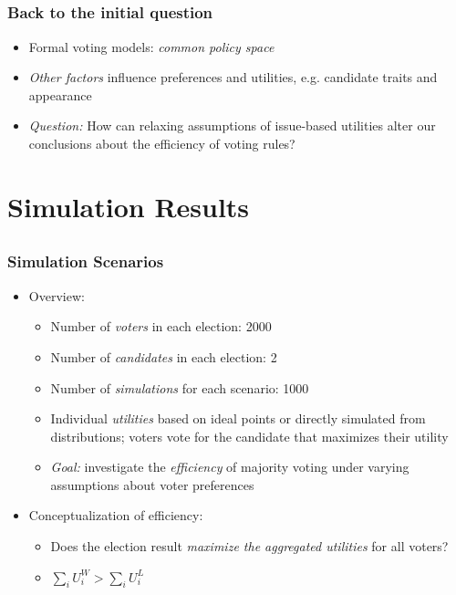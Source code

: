 \documentclass{beamer}
\begin{document}
\subsection{}
\begin{frame}%
  \frametitle{Back to the initial question}
  \begin{itemize}
  \item Formal voting models: \emph{common policy space}
  \item \emph{Other factors} influence preferences and utilities, e.g. candidate traits and appearance \citep[e.g.][]{hayes2005candidate,todorov2005inferences}
\item \emph{Question:} How can relaxing assumptions of issue-based utilities alter our conclusions about the efficiency of voting rules?
\end{itemize}
\end{frame}


\section{Simulation Results}
\subsection{}
\begin{frame}%
  \frametitle{Simulation Scenarios}
  \begin{itemize}
    \item Overview:
    \begin{itemize}
      \item Number of \emph{voters} in each election: 2000
      \item Number of \emph{candidates} in each election: 2
      \item Number of \emph{simulations} for each scenario: 1000
      \item Individual \emph{utilities} based on ideal points or directly simulated from distributions; voters vote for the candidate that maximizes their utility
      \item \emph{Goal:} investigate the \emph{efficiency} of majority voting under varying assumptions about voter preferences
    \end{itemize}
    \item Conceptualization of efficiency:
    \begin{itemize}
      \item Does the election result \emph{maximize the aggregated utilities} for all voters?
      \item $ \sum_i U_i^{W} > \sum_i U_i^{L} $
    \end{itemize}
  \end{itemize}
\end{frame}
\end{document}
